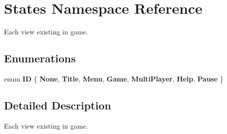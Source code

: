 \hypertarget{namespaceStates}{}\section{States Namespace Reference}
\label{namespaceStates}


Each view existing in game.  


\subsection*{Enumerations}
\begin{DoxyCompactItemize}
\item 
\mbox{\label{namespaceStates_a571a0dc62822f97bb9511eb013d8e1c3}} 
enum {\bfseries ID} \{ \newline
{\bfseries None}, 
{\bfseries Title}, 
{\bfseries Menu}, 
{\bfseries Game}, 
\newline
{\bfseries Multi\+Player}, 
{\bfseries Help}, 
{\bfseries Pause}
 \}
\end{DoxyCompactItemize}


\subsection{Detailed Description}
Each view existing in game. 